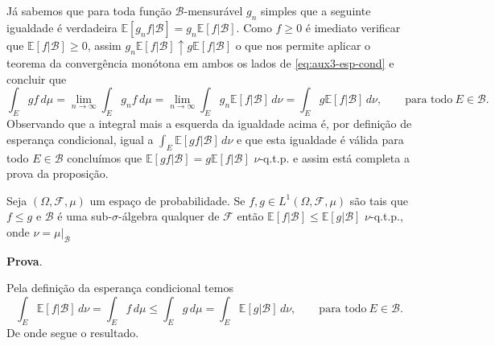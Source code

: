 Já sabemos que para toda função $\mathcal{B}$-mensurável $g_n$ simples que a seguinte igualdade é verdadeira 
$\mathbb{E}[g_nf|\mathcal{B}]=g_n\mathbb{E}[f|\mathcal{B}]$. Como $f\geq 0$ é imediato verificar que $\mathbb{E}[f|\mathcal{B}]\geq 0$, assim 
$g_n\mathbb{E}[f|\mathcal{B}]\uparrow g\mathbb{E}[f|\mathcal{B}]$ o que nos permite aplicar o teorema da convergência monótona em 
ambos os lados de \eqref{eq:aux3-esp-cond} e concluir que 
$$
\int_{E}gf\, d\mu
=
\lim_{n\to\infty}\int_{E}g_nf\, d\mu = 
\lim_{n\to\infty}\int_{E} g_n\mathbb{E}[f|\mathcal{B}]\, d\nu=
\int_{E} g\mathbb{E}[f|\mathcal{B}]\, d\nu
,\qquad\text{para todo}\ E\in\mathcal{B}.
$$
Observando que a integral mais a esquerda da igualdade acima é, por definição de esperança condicional, igual a $\int_{E} \mathbb{E}[gf|\mathcal{B}]\, d\nu$ e
que esta igualdade é válida para todo $E\in\mathcal{B}$ concluímos que $\mathbb{E}[gf|\mathcal{B}]=g\mathbb{E}[f|\mathcal{B}]$ $\nu$-q.t.p. 
e assim está completa a prova da proposição.

\bigskip

\begin{proposicao}
	Seja $(\Omega,\mathcal{F},\mu)$ um espaço de probabilidade. Se $f,g\in L^1(\Omega,\mathcal{F},\mu)$ são tais que $f\leq g$ e 
	$\mathcal{B}$ é uma sub-$\sigma$-álgebra qualquer de $\mathcal{F}$ então 
	$\mathbb{E}[f|\mathcal{B}]\leq \mathbb{E}[g|\mathcal{B}]$ $\nu$-q.t.p., onde $\nu=\mu|_{\mathcal{B}}$
\end{proposicao}
\textbf{Prova}.

Pela definição da esperança condicional temos 
$$
\int_{E} \mathbb{E}[f|\mathcal{B}]\, d\nu= \int_{E} f\, d\mu 
\leq 
\int_{E} g\, d\mu=\int_{E} \mathbb{E}[g|\mathcal{B}]\, d\nu,
\qquad \text{para todo}\ E\in\mathcal{B}.
$$
De onde segue o resultado.

\bigskip

